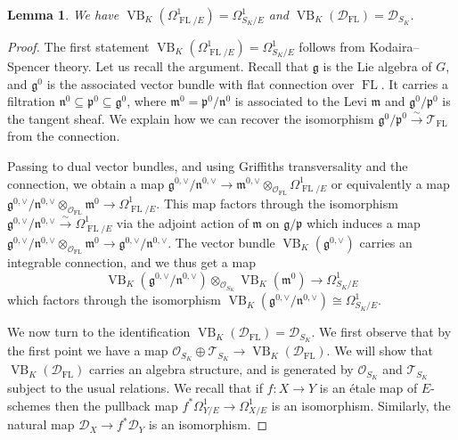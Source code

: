 \documentclass[10pt, oneside]{amsart}
\numberwithin{equation}{subsection}
\newtheorem{lemma}[equation]{Lemma}
\theoremstyle{definition}
\theoremstyle{remark}
\newcommand{\opn}[1]{\operatorname{#1}}
\begin{document}
\begin{lemma} 
We have $\opn{VB}_K(\Omega^1_{\opn{FL}/E}) = \Omega^1_{S_K/E}$ and $\opn{VB}_K( \mathcal{D}_{\opn{FL}}) = \mathcal{D}_{S_{K}}$. 
\end{lemma}
\begin{proof} 
The first statement $\opn{VB}_K(\Omega^1_{\opn{FL}/E}) = \Omega^1_{S_K/E}$ follows from Kodaira--Spencer theory. Let us  recall the argument. 
Recall that  $\mathfrak{g}$ is the  Lie algebra of $G$, and $\mathfrak{g}^{ 0}$ is the associated vector bundle with flat connection over $\opn{FL}$. It carries a filtration $\mathfrak{n}^{0} \subseteq \mathfrak{p}^{0} \subseteq \mathfrak{g}^{0}$, where $\mathfrak{m}^0 = \mathfrak{p}^{0}/\mathfrak{n}^{0}$ is associated to the Levi $\mathfrak{m}$ and $\mathfrak{g}^{0}/\mathfrak{p}^{0}$ is the tangent sheaf. We explain how we can recover the isomorphism $\mathfrak{g}^0/\mathfrak{p}^0 \xrightarrow{\sim} \mathcal{T}_{\opn{FL}}$ from the connection. 

Passing to dual vector bundles, and using Griffiths transversality and the connection, we obtain a map  $\mathfrak{g}^{0,\vee}/\mathfrak{n}^{0,\vee} \rightarrow \mathfrak{m}^{0,\vee} \otimes_{\mathcal{O}_{\opn{FL}}} \Omega^1_{\opn{FL}/E} $ or equivalently a map $\mathfrak{g}^{0,\vee}/\mathfrak{n}^{0,\vee} \otimes_{\mathcal{O}_{\opn{FL}}}\mathfrak{m}^0 \rightarrow \Omega^1_{\opn{FL}/E} $. This map factors through the isomorphism $\mathfrak{g}^{0,\vee}/\mathfrak{n}^{0,\vee} \xrightarrow{\sim} \Omega^1_{\opn{FL}/E}$ via the adjoint action of $\mathfrak{m}$ on $\mathfrak{g}/\mathfrak{p}$ which induces a map $\mathfrak{g}^{0,\vee}/\mathfrak{n}^{0,\vee} \otimes_{\mathcal{O}_{\opn{FL}}} \mathfrak{m}^0 \rightarrow \mathfrak{g}^{0,\vee}/\mathfrak{n}^{0,\vee}$. The vector bundle $\opn{VB}_K(\mathfrak{g}^{0,\vee})$ carries an integrable connection, and we thus get a map 
\[
\opn{VB}_K(\mathfrak{g}^{0,\vee}/\mathfrak{n}^{0,\vee}) \otimes_{\mathcal{O}_{S_K}} \opn{VB}_K( \mathfrak{m}^0)\rightarrow \Omega^1_{S_K/E}
\]
which factors through the isomorphism $\opn{VB}_K(\mathfrak{g}^{0,\vee}/\mathfrak{n}^{0,\vee}) \cong \Omega^1_{S_K/E}$. 

We now turn to the identification $\opn{VB}_K( \mathcal{D}_{\opn{FL}}) = \mathcal{D}_{S_{K}}$. We first observe that by the first point we have a map $\mathcal{O}_{S_K} \oplus \mathcal{T}_{S_K} \rightarrow \opn{VB}_K( \mathcal{D}_{\opn{FL}}) $. We will show that $\opn{VB}_K( \mathcal{D}_{\opn{FL}})$ carries an algebra structure, and is generated by $\mathcal{O}_{S_K}$ and $\mathcal{T}_{S_K}$ subject to the usual relations. We recall that if $f \colon X \rightarrow Y$ is an \'etale map of $E$-schemes then the pullback map $ f^* \Omega^1_{Y/E} \rightarrow \Omega^1_{X/E}$ is an isomorphism. Similarly, the natural map $\mathcal{D}_X \rightarrow f^* \mathcal{D}_Y$ is an isomorphism. 


\end{proof}
\end{document}
